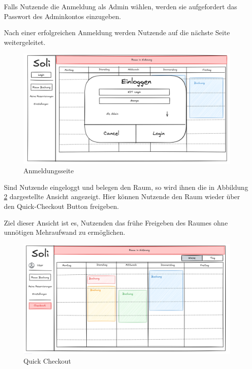 Falls Nutzende die Anmeldung als Admin wählen, werden sie aufgefordert das Passwort des Adminkontos einzugeben.

Nach einer erfolgreichen Anmeldung werden Nutzende auf die nächste Seite weitergeleitet.

\begin{figure}[ht]
    \centering
    \includegraphics[width=\textwidth]{figures/ui/anmeldungsseite}
    \caption{Anmeldungsseite}
    \label{fig:login}
\end{figure}
\clearpage

Sind Nutzende eingeloggt und belegen den Raum,
so wird ihnen die in Abbildung \ref{fig:checkout} dargestellte Ansicht angezeigt.
Hier können Nutzende den Raum wieder über den Quick-Checkout Button freigeben.


Ziel dieser Ansicht ist es, Nutzenden das frühe Freigeben des Raumes ohne unnötigen Mehraufwand zu ermöglichen.
\begin{figure}[ht]
    \centering
    \includegraphics[width=\textwidth]{figures/ui/checkout}
    \caption{Quick Checkout}
    \label{fig:checkout}
\end{figure}
\clearpage

